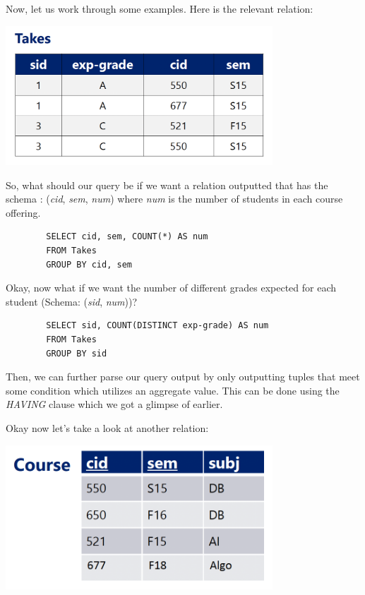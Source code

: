 \documentclass{article}
\begin{document}
Now, let us work through some examples. Here is the relevant relation:

\includegraphics[width=10cm]{Assets/groupByExample.png}

So, what should our query be if we want a relation outputted that has the schema : (\textit{cid}, \textit{sem}, \textit{num}) where \textit{num} is the number of students in each course offering.

\begin{tcolorbox}
    \begin{verbatim}
        SELECT cid, sem, COUNT(*) AS num
        FROM Takes
        GROUP BY cid, sem
    \end{verbatim}
\end{tcolorbox}

Okay, now what if we want the number of different grades expected for each student (Schema: (\textit{sid}, \textit{num}))?

\begin{tcolorbox}
    \begin{verbatim}
        SELECT sid, COUNT(DISTINCT exp-grade) AS num
        FROM Takes
        GROUP BY sid
    \end{verbatim}
\end{tcolorbox}

Then, we can further parse our query output by only outputting tuples that meet some condition which utilizes an aggregate value. This can be done using the \textit{HAVING} clause which we got a glimpse of earlier.

Okay now let's take a look at another relation:

\includegraphics[width=10cm]{Assets/havingExample.png}
\end{document}
